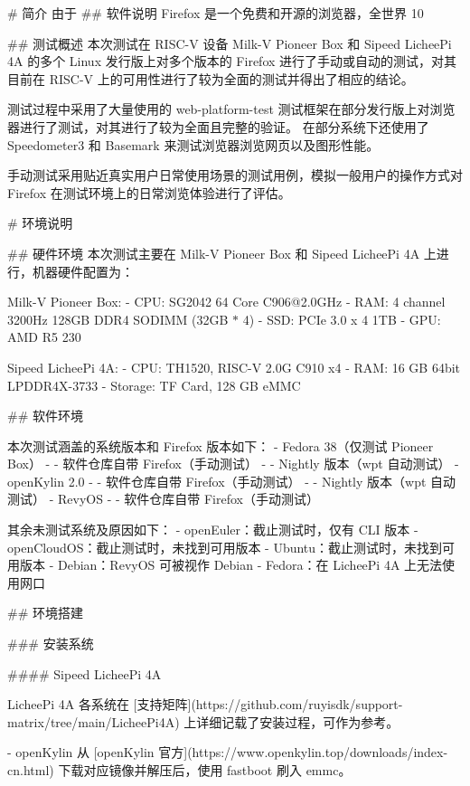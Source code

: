 \documentclass{article}
\begin{document}
\begin{markdown}

# 简介
由于
## 软件说明
Firefox 是一个免费和开源的浏览器，全世界 10%

## 测试概述
本次测试在 RISC-V 设备 Milk-V Pioneer Box 和 Sipeed LicheePi 4A 的多个 Linux 发行版上对多个版本的 Firefox 进行了手动或自动的测试，对其目前在 RISC-V 上的可用性进行了较为全面的测试并得出了相应的结论。

测试过程中采用了大量使用的 web-platform-test 测试框架在部分发行版上对浏览器进行了测试，对其进行了较为全面且完整的验证。
在部分系统下还使用了 Speedometer3 和 Basemark 来测试浏览器浏览网页以及图形性能。

手动测试采用贴近真实用户日常使用场景的测试用例，模拟一般用户的操作方式对 Firefox 在测试环境上的日常浏览体验进行了评估。

# 环境说明

## 硬件环境
本次测试主要在 Milk-V Pioneer Box 和 Sipeed LicheePi 4A 上进行，机器硬件配置为：

Milk-V Pioneer Box:
- CPU: SG2042 64 Core C906@2.0GHz
- RAM: 4 channel 3200Hz 128GB DDR4 SODIMM (32GB $*$ 4)
- SSD: PCIe 3.0 x 4 1TB
- GPU: AMD R5 230

Sipeed LicheePi 4A:
- CPU: TH1520, RISC-V 2.0G C910 x4
- RAM: 16 GB 64bit LPDDR4X-3733
- Storage: TF Card, 128 GB eMMC

## 软件环境

本次测试涵盖的系统版本和 Firefox 版本如下：
- Fedora 38（仅测试 Pioneer Box）
- - 软件仓库自带 Firefox（手动测试）
- - Nightly 版本（wpt 自动测试）
- openKylin 2.0
- - 软件仓库自带 Firefox（手动测试）
- - Nightly 版本（wpt 自动测试）
- RevyOS
- - 软件仓库自带 Firefox（手动测试）

其余未测试系统及原因如下：
- openEuler：截止测试时，仅有 CLI 版本
- openCloudOS：截止测试时，未找到可用版本
- Ubuntu：截止测试时，未找到可用版本
- Debian：RevyOS 可被视作 Debian
- Fedora：在 LicheePi 4A 上无法使用网口

## 环境搭建


### 安装系统

#### Sipeed LicheePi 4A

LicheePi 4A 各系统在 [支持矩阵](https://github.com/ruyisdk/support-matrix/tree/main/LicheePi4A) 上详细记载了安装过程，可作为参考。

- openKylin
从 [openKylin 官方](https://www.openkylin.top/downloads/index-cn.html) 下载对应镜像并解压后，使用 fastboot 刷入 emmc。


\end{markdown}
\end{document}
